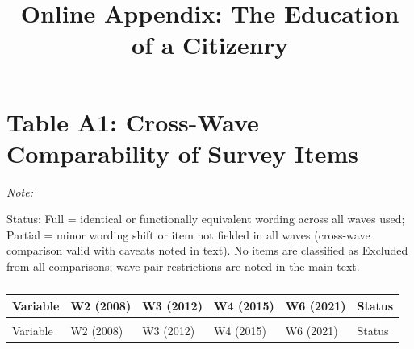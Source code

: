 \documentclass[
  12pt,
  letterpaper]{article}
\title{Online Appendix: The Education of a Citizenry}
\author{}
\date{}
\begin{document}
\maketitle


\section*{Table A1: Cross-Wave Comparability of Survey
Items}\label{table-a1-cross-wave-comparability-of-survey-items}

\begingroup\fontsize{7}{9}\selectfont

\begin{ThreePartTable}
\begin{TableNotes}[para]
\item \textit{Note:} 
\item Status: Full = identical or functionally equivalent wording across all waves used; Partial = minor wording shift or item not fielded in all waves (cross-wave comparison valid with caveats noted in text). No items are classified as Excluded from all comparisons; wave-pair restrictions are noted in the main text.
\end{TableNotes}

\begin{longtable}[t]{>{\raggedright\arraybackslash}p{2.0cm}>{\raggedright\arraybackslash}p{2.3cm}>{\raggedright\arraybackslash}p{2.3cm}>{\raggedright\arraybackslash}p{2.3cm}>{\raggedright\arraybackslash}p{2.3cm}>{\raggedright\arraybackslash}p{1.5cm}}

\caption{\label{tbl-tableA1}}

\tabularnewline

\toprule
Variable & W2 (2008) & W3 (2012) & W4 (2015) & W6 (2021) & Status\\
\midrule
\endfirsthead
\multicolumn{6}{@{}l}{\textit{(continued)}}\\
\toprule
Variable & W2 (2008) & W3 (2012) & W4 (2015) & W6 (2021) & Status\\
\midrule
\endhead


\end{longtable}
\end{ThreePartTable}
\end{document}
